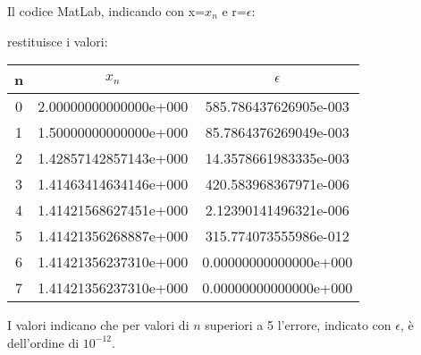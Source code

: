Il codice MatLab, indicando con x=$x_n$ e r=$\epsilon$:

\newpage
restituisce i valori:
\begin{center}
\begin{tabular}{c|c|c}
n & $x_n$ & $\epsilon$ \\
\hline
    0 & 2.00000000000000e+000 & 585.786437626905e-003\\
    1 & 1.50000000000000e+000 & 85.7864376269049e-003\\
    2 & 1.42857142857143e+000 & 14.3578661983335e-003\\
    3 & 1.41463414634146e+000 & 420.583968367971e-006\\
    4 & 1.41421568627451e+000 & 2.12390141496321e-006\\
    5 & 1.41421356268887e+000 & 315.774073555986e-012\\
    6 & 1.41421356237310e+000 & 0.00000000000000e+000\\
    7 & 1.41421356237310e+000 & 0.00000000000000e+000\\
\end{tabular}
\end{center}
I valori indicano che per valori di $n$ superiori a 5 l'errore, indicato con $\epsilon$, è dell'ordine di \(10^{-12}\).